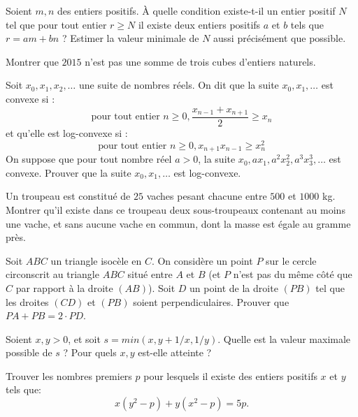 \begin{exo}{}
Soient $m,n$ des entiers positifs. À quelle condition existe-t-il un entier positif $N$
tel que pour tout entier $r \geq N$ il existe deux entiers positifs $a$ et $b$ tels que  $r=am+bn$ ? Estimer la valeur minimale de $N$ aussi précisément que possible.
\end{exo}

\begin{exo}{}Montrer que $2015$ n'est pas une somme
de trois cubes d'entiers naturels. 
\end{exo}

\begin{exo}{}Soit $x_0, x_1, x_2, \ldots $ une suite de nombres réels. On dit que la suite $x_0, x_1, \ldots$ est convexe si :
\[
\textrm {pour tout entier } n \geq 0, \frac{x_{n-1}+x_{n+1}}{2}\geq x_n
\]
et qu'elle est log-convexe si :
\[
\textrm {pour tout entier } n \geq 0,  x_{n+1}x_{n-1}\geq x_n^2
\]
 On suppose que pour tout nombre réel $a>0$, la suite $x_0, a x_1, a^2 x_2^2, a^3 x_3^3, \ldots$ est convexe. Prouver que la suite $x_0, x_1, \ldots $ est log-convexe.

\end{exo}

\begin{exo}{}Un troupeau est constitué de $25$ vaches
pesant chacune entre $500$ et $1000$ kg. Montrer qu'il existe dans
ce troupeau deux sous-troupeaux contenant au moins une vache, et sans
aucune vache en commun, dont la masse est égale au gramme près. 
\end{exo}

\begin{exo}{}Soit $ABC$ un triangle isocèle en $C$. On considère un point $P$ sur le cercle circonscrit au triangle $ABC$ situé entre $A$ et $B$ (et $P$ n'est pas du même côté que $C$ par rapport à la droite $(AB)$). Soit $D$ un point de la droite $(PB)$ tel que les droites $(CD)$ et $(PB)$ soient perpendiculaires. Prouver que $PA+PB= 2 \cdot PD$.
\end{exo}

\begin{exo}{}Soient $x,y>0$, et soit $s=min(x,y+1/x,1/y)$. Quelle est la valeur maximale possible de $s$ ? Pour quels $x,y$ est-elle atteinte ?

\end{exo}

\begin{exo}{ }
Trouver les nombres premiers $p$ pour lesquels il existe des entiers positifs $x$ et $y$ tels que:
$$
x(y^2-p)+y(x^2-p)=5p.
$$\end{exo}

